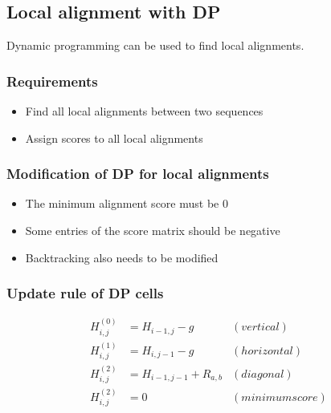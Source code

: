 %
%

%
%
\subsection{Local alignment with DP}
Dynamic programming can be used to find local alignments.

%
%
\subsubsection*{Requirements}
\begin{itemize}
\item Find all local alignments between two sequences
\item Assign scores to all local alignments
\end{itemize}

%
%
\subsubsection*{Modification of DP for local alignments}
\begin{itemize}
\item The minimum alignment score must be 0
\item Some entries of the score matrix should be negative
\item Backtracking also needs to be modified
\end{itemize}

%
%
\subsubsection*{Update rule of DP cells}
\begin{align*}
H_{i,j}^{(0)} &= H_{i-1,j} - g &(vertical) \\
H_{i,j}^{(1)} &= H_{i,j-1} - g	&(horizontal) \\
H_{i,j}^{(2)} &= H_{i-1,j-1} + R_{a,b} &(diagonal) \\
H_{i,j}^{(2)} &= 0 &(minimum score)
\end{align*}

%
%
